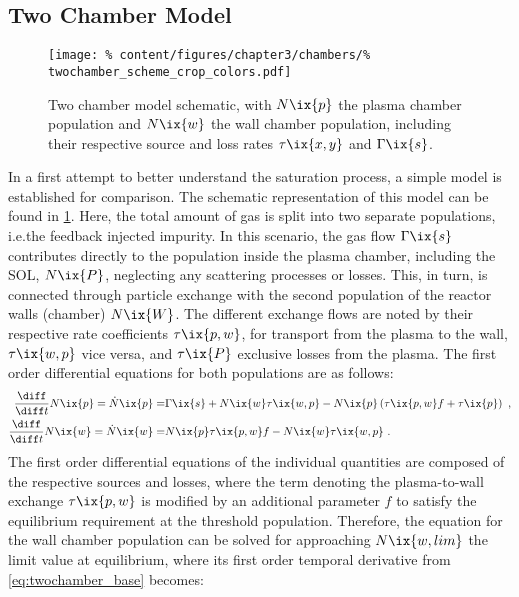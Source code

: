 %
        \subsection{Two Chamber Model}\label{subsec:twochamb}%
%
            \begin{figure}[t]%
                \centering%
                \texttt{[image: \%
                    content/figures/chapter3/chambers/\%
                    twochamber\_scheme\_crop\_colors.pdf]}%
                \caption{Two chamber model schematic, with $N\ix{p}$ the plasma chamber population and $N\ix{w}$ the wall chamber population, including their respective source and loss rates $\tau\ix{x,y}$ and $\Gamma\ix{s}$.}\label{fig:twochamber_schematic}%
            \end{figure}%
%
            In a first attempt to better understand the saturation process, a simple model is established for comparison. The schematic representation of this model can be found in \cref{fig:twochamber_schematic}. Here, the total amount of gas is split into two separate populations, i.e.the feedback injected impurity. In this scenario, the gas flow $\Gamma\ix{s}$ contributes directly to the population inside the plasma chamber, including the SOL, $N\ix{P}$, neglecting any scattering processes or losses. This, in turn, is connected through particle exchange with the second population of the reactor walls (chamber) $N\ix{W}$. The different exchange flows are noted by their respective rate coefficients $\tau\ix{p,w}$, for transport from the plasma to the wall, $\tau\ix{w,p}$ vice versa, and $\tau\ix{P}$ exclusive losses from the plasma. The first order differential equations for both populations are as follows:%
%
            \begin{align}
                \begin{split}\label{eq:twochamber_base}%
                    \frac{\diff}{\diff t}N\ix{p}=\dot{N}\ix{p}=&\Gamma\ix{s}+N\ix{w}\tau\ix{w,p}-N\ix{p}\left(\tau\ix{p,w}f+\tau\ix{p}\right)\,\,,\\%
                    \frac{\diff}{\diff t}N\ix{w}=\dot{N}\ix{w}=&N\ix{p}\tau\ix{p,w}f-N\ix{w}\tau\ix{w,p}\,\,.%
                \end{split}%
            \end{align}%
%
            The first order differential equations of the individual quantities are composed of the respective sources and losses, where the term denoting the plasma-to-wall exchange $\tau\ix{p,w}$ is modified by an additional parameter $f$ to satisfy the equilibrium requirement at the threshold population. Therefore, the equation for the wall chamber population can be solved for approaching $N\ix{w,lim}$ the limit value at equilibrium, where its first order temporal derivative from \cref{eq:twochamber_base} becomes:%

